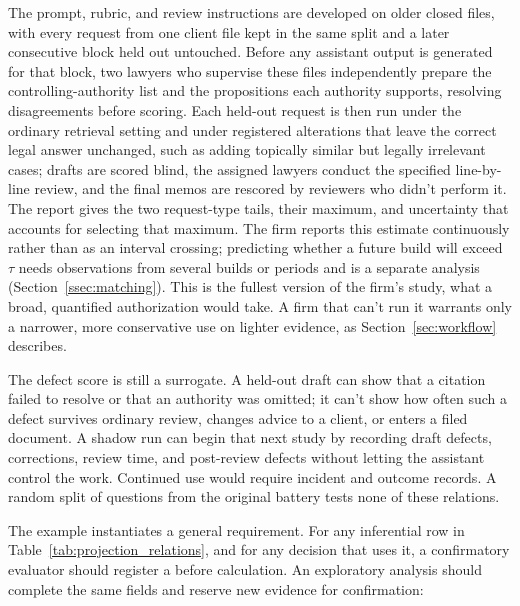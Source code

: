\documentclass[12pt]{article}
\begin{document}
The prompt, rubric, and review instructions are developed on older closed files, with every request from one client file kept in the same split and a later consecutive block held out untouched. Before any assistant output is generated for that block, two lawyers who supervise these files independently prepare the controlling-authority list and the propositions each authority supports, resolving disagreements before scoring. Each held-out request is then run under the ordinary retrieval setting and under registered alterations that leave the correct legal answer unchanged, such as adding topically similar but legally irrelevant cases; drafts are scored blind, the assigned lawyers conduct the specified line-by-line review, and the final memos are rescored by reviewers who didn't perform it. The report gives the two request-type tails, their maximum, and uncertainty that accounts for selecting that maximum. The firm reports this estimate continuously rather than as an interval crossing; predicting whether a future build will exceed \(\tau\) needs observations from several builds or periods and is a separate analysis (Section~\ref{ssec:matching}). This is the fullest version of the firm's study, what a broad, quantified authorization would take. A firm that can't run it warrants only a narrower, more conservative use on lighter evidence, as Section~\ref{sec:workflow} describes.

The defect score is still a surrogate. A held-out draft can show that a citation failed to resolve or that an authority was omitted; it can't show how often such a defect survives ordinary review, changes advice to a client, or enters a filed document. A shadow run can begin that next study by recording draft defects, corrections, review time, and post-review defects without letting the assistant control the work. Continued use would require incident and outcome records. A random split of questions from the original battery tests none of these relations.

The example instantiates a general requirement. For any inferential row in Table~\ref{tab:projection_relations}, and for any decision that uses it, a confirmatory evaluator should register a  before calculation. An exploratory analysis should complete the same fields and reserve new evidence for confirmation:
\end{document}
